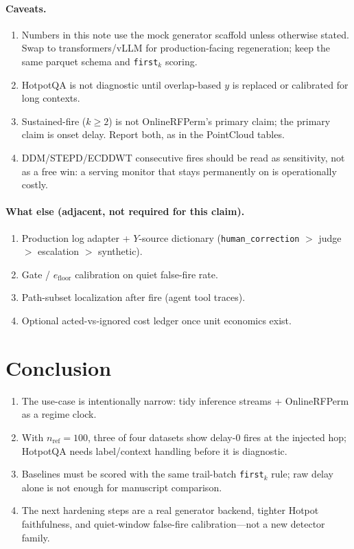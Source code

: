 \documentclass[11pt]{article}
\begin{document}
\paragraph{Caveats.}
\begin{enumerate}[leftmargin=1.2em]
\item Numbers in this note use the mock generator scaffold unless otherwise
stated. Swap to transformers/vLLM for production-facing regeneration; keep the
same parquet schema and \texttt{first}$_k$ scoring.
\item HotpotQA is not diagnostic until overlap-based $y$ is replaced or
calibrated for long contexts.
\item Sustained-fire ($k\ge 2$) is not OnlineRFPerm's primary claim; the primary
claim is onset delay. Report both, as in the PointCloud tables.
\item DDM/STEPD/ECDDWT consecutive fires should be read as sensitivity, not as
a free win: a serving monitor that stays permanently on is operationally costly.
\end{enumerate}

\paragraph{What else (adjacent, not required for this claim).}
\begin{enumerate}[leftmargin=1.2em]
\item Production log adapter + $Y$-source dictionary
(\texttt{human\_correction} $>$ judge $>$ escalation $>$ synthetic).
\item Gate / $e_{\mathrm{floor}}$ calibration on quiet false-fire rate.
\item Path-subset localization after fire (agent tool traces).
\item Optional acted-vs-ignored cost ledger once unit economics exist.
\end{enumerate}

\section{Conclusion}
\begin{enumerate}[leftmargin=1.2em]
\item The use-case is intentionally narrow: tidy inference streams + OnlineRFPerm
as a regime clock.
\item With $n_{\mathrm{ref}}=100$, three of four datasets show delay-$0$ fires at
the injected hop; HotpotQA needs label/context handling before it is diagnostic.
\item Baselines must be scored with the same trail-batch \texttt{first}$_k$ rule;
raw delay alone is not enough for manuscript comparison.
\item The next hardening steps are a real generator backend, tighter Hotpot
faithfulness, and quiet-window false-fire calibration---not a new detector
family.
\end{enumerate}
\end{document}
